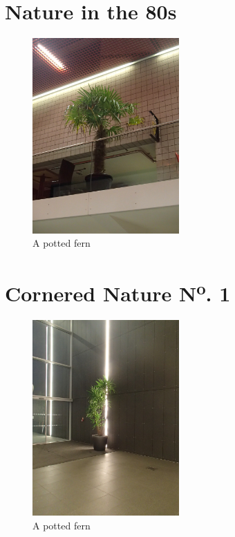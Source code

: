 \documentclass{book}
\begin{document}
    \chapter{Nature in the 80s}
        \begin{figure}
            \centering
            \includegraphics[width=0.5\textwidth]{figures/P1050152.JPG}
            \caption{\label{fig:pottedfern}A potted fern}
        \end{figure}
    \chapter{Cornered Nature N\textsuperscript{o}. 1}
        \begin{figure}
            \centering
            \includegraphics[width=0.5\textwidth]{figures/P1050156.JPG}
            \caption{\label{fig:pottedfern}A potted fern}
        \end{figure}
\end{document}
